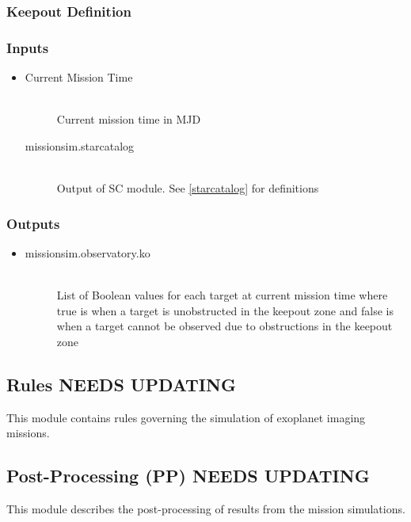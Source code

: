 \documentclass[]{asme2ej}
\begin{document}
\subsubsection{Keepout Definition}

\subsubsection*{Inputs}
\begin{itemize}
    \item
    \begin{description}
        \item[Current Mission Time] \hfill \\
        Current mission time in MJD 
        \item[missionsim.starcatalog] \hfill \\
        Output of SC module. See \ref{starcatalog} for definitions
    \end{description}
\end{itemize}

\subsubsection*{Outputs}
\begin{itemize}
    \item 
    \begin{description}
        \item[missionsim.observatory.ko] \hfill \\
        List of Boolean values for each target at current mission time where true is when a target is unobstructed in the keepout zone and false is when a target cannot be observed due to obstructions in the keepout zone
    \end{description}
\end{itemize}


\subsection{Rules NEEDS UPDATING}
This module contains rules governing the simulation of exoplanet imaging missions.


\subsection{Post-Processing (PP) NEEDS UPDATING}
This module describes the post-processing of results from the mission simulations.
\end{document}
